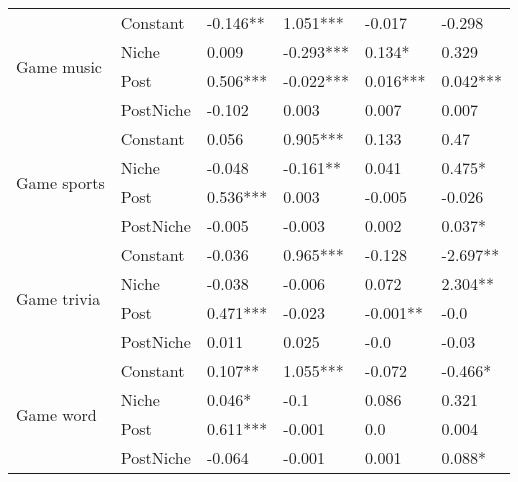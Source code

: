 \begin{longtable}[h!]{llllll}
\cline{1-6}
\multirow{4}{*}{Game music} & Constant &            -0.146** &    1.051*** &     -0.017 &     -0.298 \\
          & Niche &               0.009 &   -0.293*** &     0.134* &      0.329 \\
          & Post &            0.506*** &   -0.022*** &   0.016*** &   0.042*** \\
          & PostNiche &              -0.102 &       0.003 &      0.007 &      0.007 \\
\cline{1-6}
\multirow{4}{*}{Game sports} & Constant &               0.056 &    0.905*** &      0.133 &       0.47 \\
          & Niche &              -0.048 &    -0.161** &      0.041 &     0.475* \\
          & Post &            0.536*** &       0.003 &     -0.005 &     -0.026 \\
          & PostNiche &              -0.005 &      -0.003 &      0.002 &     0.037* \\
\cline{1-6}
\multirow{4}{*}{Game trivia} & Constant &              -0.036 &    0.965*** &     -0.128 &   -2.697** \\
          & Niche &              -0.038 &      -0.006 &      0.072 &    2.304** \\
          & Post &            0.471*** &      -0.023 &   -0.001** &       -0.0 \\
          & PostNiche &               0.011 &       0.025 &       -0.0 &      -0.03 \\
\cline{1-6}
\multirow{4}{*}{Game word} & Constant &             0.107** &    1.055*** &     -0.072 &    -0.466* \\
          & Niche &              0.046* &        -0.1 &      0.086 &      0.321 \\
          & Post &            0.611*** &      -0.001 &        0.0 &      0.004 \\
          & PostNiche &              -0.064 &      -0.001 &      0.001 &     0.088* \\
\end{longtable}
